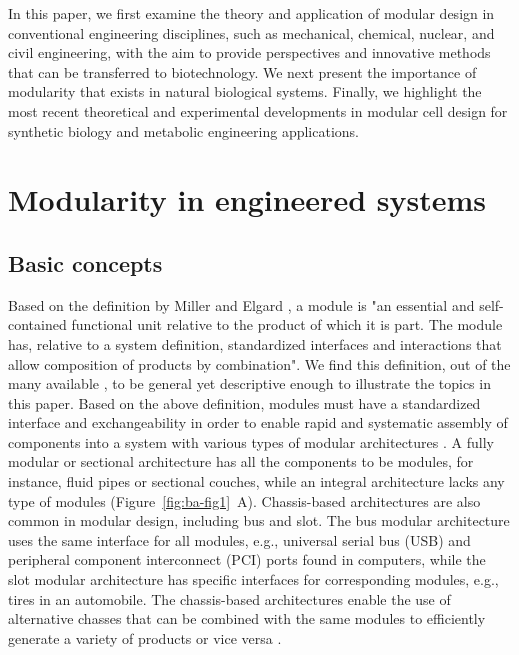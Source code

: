 In this paper, we first examine the theory and application of modular design in conventional engineering disciplines, such as mechanical, chemical, nuclear, and civil engineering, with the aim to provide perspectives and innovative methods that can be transferred to biotechnology.
We next present the importance of modularity that exists in natural biological systems.
Finally, we highlight the most recent theoretical and experimental developments in modular cell design for synthetic biology and metabolic engineering applications.

\section{Modularity in engineered systems}

\subsection{Basic concepts}

Based on the definition by Miller and Elgard \citep{miller1998}, a module is "an essential and self-contained functional unit relative to the product of which it is part.
The module has, relative to a system definition, standardized interfaces and interactions that allow composition of products by combination".
We find this definition, out of the many available \citep{salvador2007}, to be general yet descriptive enough to illustrate the topics in this paper.
Based on the above definition, modules must have a standardized interface and exchangeability in order to enable rapid and systematic assembly of components into a system with various types of modular architectures \citep{ulrich1995}.
A fully modular or sectional architecture has all the components to be modules, for instance, fluid pipes or sectional couches, while an integral architecture lacks any type of modules (Figure~\ref{fig:ba-fig1}~A).
Chassis-based architectures are also common in modular design, including bus and slot.
The bus modular architecture uses the same interface for all modules, e.g., universal serial bus (USB) and peripheral component interconnect (PCI) ports found in computers, while the slot modular architecture has specific interfaces for corresponding modules, e.g., tires in an automobile.
The chassis-based architectures enable the use of alternative chasses that can be combined with the same modules to efficiently generate a variety of products or vice versa \citep{jose2005}.

